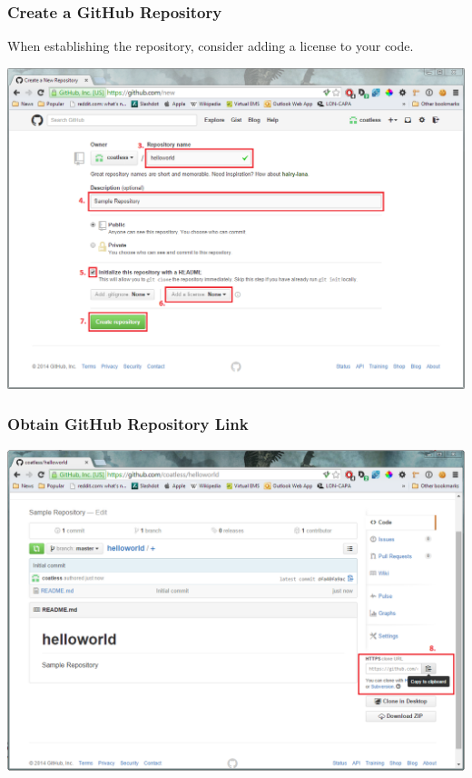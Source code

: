 \documentclass{beamer}\usepackage[]{graphicx}\usepackage[]{color}
\begin{document}
\begin{frame}
\frametitle{Create a GitHub Repository}
When establishing the repository, consider adding a license to your code.
\begin{center}
\includegraphics[scale=0.32]{img/git/repo_details.png}
\end{center}

\end{frame}

\begin{frame}
\frametitle{Obtain GitHub Repository Link}

\begin{center}
\includegraphics[scale=0.32]{img/git/copy_repository.png}
\end{center}

\end{frame}
\end{document}
